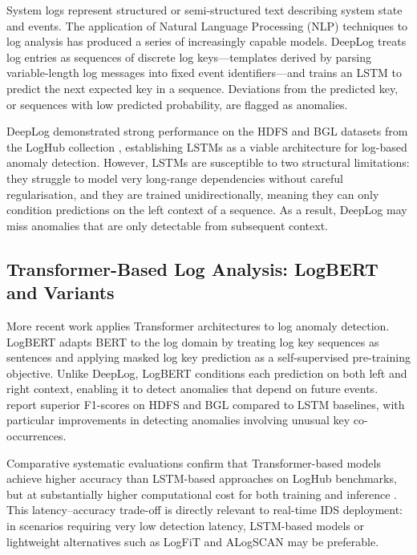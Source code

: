 \documentclass[12pt,a4paper]{report}
\begin{document}
System logs represent structured or semi-structured text describing system state and events. The application of Natural Language Processing (NLP) techniques to log analysis has produced a series of increasingly capable models. DeepLog \citep{du2017} treats log entries as sequences of discrete log keys---templates derived by parsing variable-length log messages into fixed event identifiers---and trains an LSTM to predict the next expected key in a sequence. Deviations from the predicted key, or sequences with low predicted probability, are flagged as anomalies.

DeepLog demonstrated strong performance on the HDFS and BGL datasets from the LogHub collection \citep{zhu2023}, establishing LSTMs as a viable architecture for log-based anomaly detection. However, LSTMs are susceptible to two structural limitations: they struggle to model very long-range dependencies without careful regularisation, and they are trained unidirectionally, meaning they can only condition predictions on the left context of a sequence. As a result, DeepLog may miss anomalies that are only detectable from subsequent context.

\subsection{Transformer-Based Log Analysis: LogBERT and Variants}
\label{sec:logbert}

More recent work applies Transformer architectures to log anomaly detection. LogBERT \citep{guo2021} adapts BERT to the log domain by treating log key sequences as sentences and applying masked log key prediction as a self-supervised pre-training objective. Unlike DeepLog, LogBERT conditions each prediction on both left and right context, enabling it to detect anomalies that depend on future events. \citet{guo2021} report superior F1-scores on HDFS and BGL compared to LSTM baselines, with particular improvements in detecting anomalies involving unusual key co-occurrences.

Comparative systematic evaluations confirm that Transformer-based models achieve higher accuracy than LSTM-based approaches on LogHub benchmarks, but at substantially higher computational cost for both training and inference \citep{guo2021,le2023}. This latency--accuracy trade-off is directly relevant to real-time IDS deployment: in scenarios requiring very low detection latency, LSTM-based models or lightweight alternatives such as LogFiT \citep{qi2023} and ALogSCAN \citep{raeiszadeh2025} may be preferable.
\end{document}
